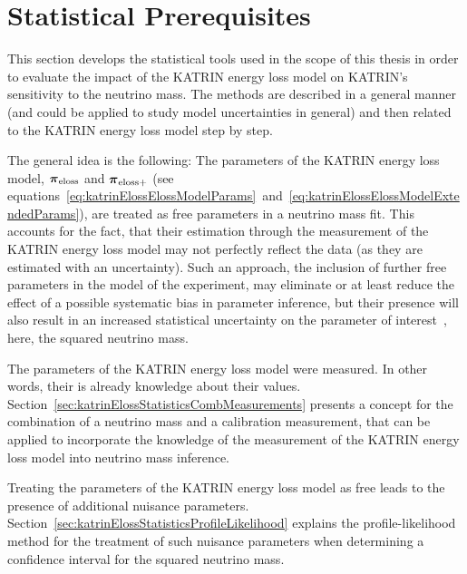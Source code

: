 \def\currentRootFolder{chapter/sensitivityStudyWithPreliminaryKatrinElossModel/statisticalPrerequisites}
\def\currentFigureFolder{\currentRootFolder/fig}



\section{Statistical Prerequisites}
\label{sec:katrinElossStatistics}
This section develops the statistical tools used in the scope of this thesis in order to evaluate the impact of the KATRIN energy loss model on KATRIN's sensitivity to the neutrino mass. The methods are described in a general manner (and could be applied to study model uncertainties in general) and then related to the KATRIN energy loss model step by step.

The general idea is the following: The parameters of the KATRIN energy loss model, $\boldsymbol{\mathbf{\pi}}_\mathrm{eloss}$ and $\boldsymbol{\mathbf{\pi}}_\mathrm{eloss+}$ (see equations~\ref{eq:katrinElossElossModelParams}~and~\ref{eq:katrinElossElossModelExtendedParams}), are treated as free parameters in a neutrino mass fit. This accounts for the fact, that their estimation through the measurement of the KATRIN energy loss model may not perfectly reflect the data (as they are estimated with an uncertainty). Such an approach, the inclusion of further free parameters in the model of the experiment, may eliminate or at least reduce the effect of a possible systematic bias in parameter inference, but their presence will also result in an increased statistical uncertainty on the parameter of interest~\cite{ReviewOfParticlePhysics}, here, the squared neutrino mass.

The parameters of the KATRIN energy loss model were measured. In other words, their is already knowledge about their values.  Section~\ref{sec:katrinElossStatisticsCombMeasurements} presents a concept for the combination of a neutrino mass and a calibration measurement, that can be applied to incorporate the knowledge of the measurement of the KATRIN energy loss model into neutrino mass inference.

Treating the parameters of the KATRIN energy loss model as free leads to the presence of additional nuisance parameters. Section~\ref{sec:katrinElossStatisticsProfileLikelihood} explains the profile-likelihood method for the treatment of such nuisance parameters when determining a confidence interval for the squared neutrino mass. 


